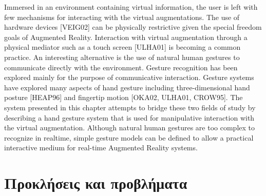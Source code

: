 Immersed in an environment containing virtual information, the user is left with few mechanisms for interacting with the virtual augmentations. The use of hardware devices [VEIG02] can be physically restrictive given the special freedom goals of Augmented Reality. Interaction with virtual augmentation through a physical mediator such as a touch screen [ULHA01] is becoming a common practice. An interesting alternative is the use of natural human gestures to communicate directly with the environment. Gesture recognition has been explored mainly for the purpose of communicative interaction. Gesture systems have explored many aspects of hand gesture including three-dimensional hand posture [HEAP96] and fingertip motion [OKA02, ULHA01, CROW95]. The system presented in this chapter attempts to bridge these two fields of study by describing a hand gesture system that is used for manipulative interaction with the virtual augmentation. Although natural human gestures are too complex to recognize in realtime, simple gesture models can be defined to allow a practical interactive medium for real-time Augmented Reality systems.

\section{Προκλήσεις και προβλήματα}


